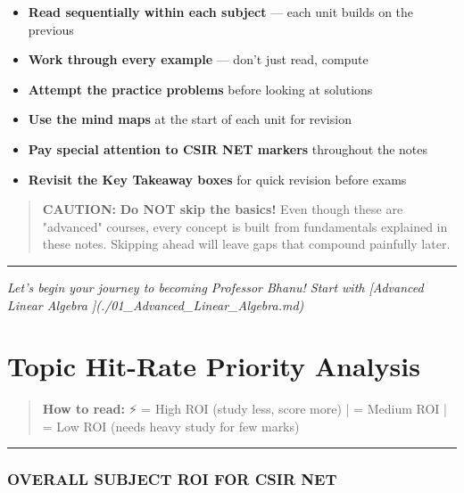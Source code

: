 \documentclass[12pt,a4paper,openany]{book}
\begin{document}
{\begin{itemize}
  \item \textbf{Read sequentially within each subject} — each unit builds on the previous
  \item \textbf{Work through every example} — don't just read, compute
  \item \textbf{Attempt the practice problems} before looking at solutions
  \item \textbf{Use the mind maps} at the start of each unit for revision
  \item \textbf{Pay special attention to  CSIR NET markers} throughout the notes
  \item \textbf{Revisit the  Key Takeaway boxes} for quick revision before exams
\end{itemize}

\begin{quote}
\textbf{ CAUTION:}
\textbf{Do NOT skip the basics!} Even though these are "advanced" courses, every concept is built from fundamentals explained in these notes. Skipping ahead will leave gaps that compound painfully later.
\end{quote}

\bigskip\noindent\rule{\textwidth}{0.4pt}\bigskip

\textit{Let's begin your journey to becoming Professor Bhanu! Start with [Advanced Linear Algebra ](./01_Advanced_Linear_Algebra.md)}

\newpage

\chapter{Topic Hit-Rate Priority Analysis}


\begin{quote}
\textbf{How to read:} ⚡ = High ROI (study less, score more) |  = Medium ROI |  = Low ROI (needs heavy study for few marks)
\end{quote}

\bigskip\noindent\rule{\textwidth}{0.4pt}\bigskip

\subsection{OVERALL SUBJECT ROI FOR CSIR NET}

}
\end{document}
